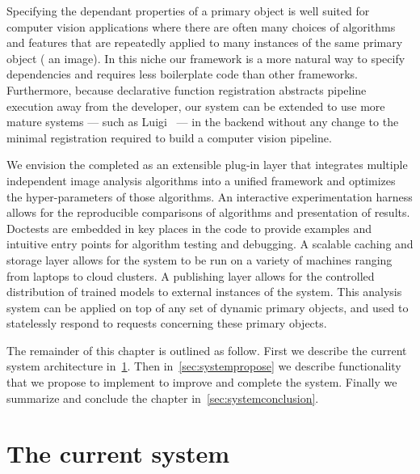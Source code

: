     Specifying the dependant properties of a primary object is well suited for
      computer vision applications where there are often many choices of
      algorithms and features that are repeatedly applied to many instances of
      the same primary object (\eg{} an image).
    In this niche our framework is a more natural way to specify dependencies
      and requires less boilerplate code than other frameworks.
    Furthermore, because declarative function registration abstracts pipeline
      execution away from the developer, our system can be extended to use more
      mature systems --- such as Luigi~\cite{bernhardsson_luigi_2016} --- in the
      backend without any change to the minimal registration required to build a
      computer vision pipeline.

    We envision the completed \depcache{} as an extensible plug-in layer that
      integrates multiple independent image analysis algorithms into a unified
      framework and optimizes the hyper-parameters of those algorithms.
    An interactive experimentation harness allows for the reproducible
      comparisons of algorithms and presentation of results.
    Doctests are embedded in key places in the code to provide examples and
      intuitive entry points for algorithm testing and debugging.
    A scalable caching and storage layer allows for the system to be run on a
      variety of machines ranging from laptops to cloud clusters.
    A publishing layer allows for the controlled distribution of trained
      models to external instances of the system.
    This analysis system can be applied on top of any set of dynamic primary
      objects, and used to statelessly respond to requests concerning these
      primary objects.

    The remainder of this chapter is outlined as follow.
    First we describe the current system architecture
      in~\cref{sec:systemcurrent}.
    Then in~\cref{sec:systempropose} we describe functionality that we propose
      to implement to improve and complete the system.
    Finally we summarize and conclude the chapter
      in~\cref{sec:systemconclusion}.
      

\section{The current system}\label{sec:systemcurrent}


